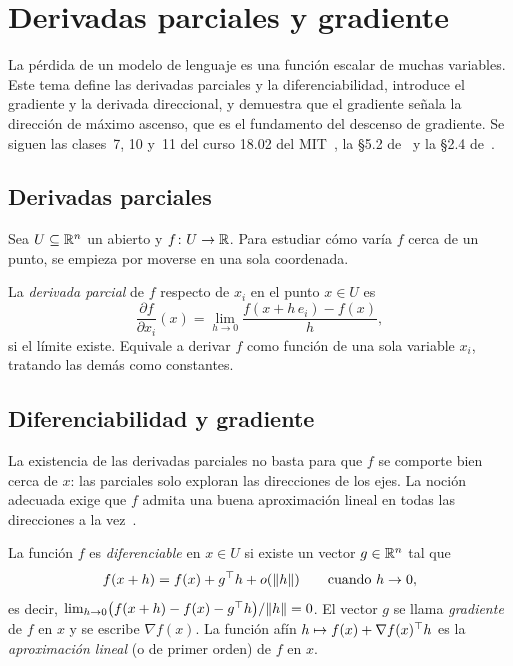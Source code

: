 \chapter{Derivadas parciales y gradiente}
\label{tema:1}

La pérdida de un modelo de lenguaje es una función escalar de muchas variables. Este tema define las derivadas parciales y la diferenciabilidad, introduce el gradiente y la derivada direccional, y demuestra que el gradiente señala la dirección de máximo ascenso, que es el fundamento del descenso de gradiente. Se siguen las clases~7, 10 y~11 del curso 18.02 del MIT~\cite{mit1802}, la §5.2 de~\cite{mml} y la §2.4 de~\cite{d2l}.

\section{Derivadas parciales}

Sea $U\subseteq\mathbb{R}^{n}$ un abierto y $f\colon U\to\mathbb{R}$. Para estudiar cómo varía $f$ cerca de un punto, se empieza por moverse en una sola coordenada.

\begin{definicion}\label{def:parcial}
La \emph{derivada parcial} de $f$ respecto de $x_i$ en el punto $x\in U$ es
\[
\frac{\partial f}{\partial x_i}(x)=\lim_{h\to 0}\frac{f(x+h\,e_i)-f(x)}{h},
\]
si el límite existe. Equivale a derivar $f$ como función de una sola variable $x_i$, tratando las demás como constantes.
\end{definicion}

\addtocounter{definicion}{1}%

\addtocounter{definicion}{1}%

\section{Diferenciabilidad y gradiente}

La existencia de las derivadas parciales no basta para que $f$ se comporte bien cerca de $x$: las parciales solo exploran las direcciones de los ejes. La noción adecuada exige que $f$ admita una buena aproximación lineal en todas las direcciones a la vez~\cite[§5.2]{mml}.

\begin{definicion}\label{def:diferenciable}
La función $f$ es \emph{diferenciable} en $x\in U$ si existe un vector $g\in\mathbb{R}^{n}$ tal que
\[
f(x+h)=f(x)+g^{\top} h+o(\lVert h\rVert)\qquad\text{cuando } h\to 0,
\]
es decir, $\lim_{h\to 0}\bigl(f(x+h)-f(x)-g^{\top} h\bigr)/\lVert h\rVert=0$. El vector $g$ se llama \emph{gradiente} de $f$ en $x$ y se escribe $\nabla f(x)$. La función afín $h\mapsto f(x)+\nabla f(x)^{\top} h$ es la \emph{aproximación lineal} (o de primer orden) de $f$ en $x$.
\end{definicion}

